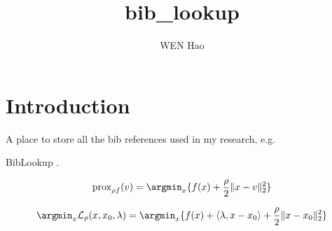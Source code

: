 \documentclass{article}
\title{bib\_lookup}
\author{WEN Hao}
\date{}
\begin{document}
\maketitle

\section{Introduction}

A place to store all the bib references used in my research, e.g. \cite{Wen_cpsc2021,torch_ecg_paper,Kang_2022_cinc2021_iop,wen_cinc2021,Pang_2021_SpineParseNet,kiyasseh2021clocs}

BibLookup \cite{bib_lookup}.

$$\operatorname{prox}_{\rho f}(v) = \argmin_x \{f(x) + \dfrac{\rho}{2} \lVert x-v \rVert_2^2\}$$

$$\argmin_x \mathcal{L}_{\rho}(x, x_0, \lambda) = \argmin_x \{f(x) + \langle \lambda, x-x_0 \rangle + \dfrac{\rho}{2} \lVert x-x_0 \rVert_2^2\}$$







\printbibliography[heading=bibliography]
\end{document}
